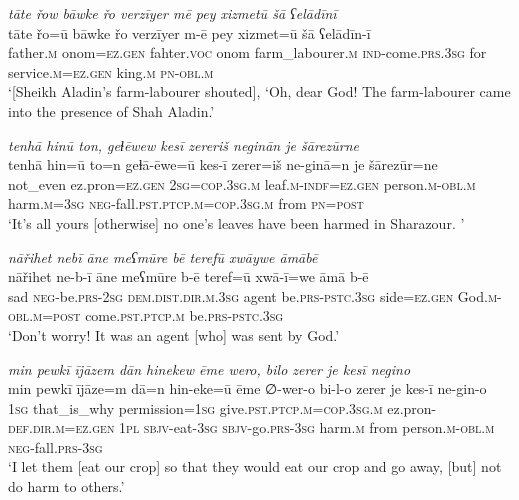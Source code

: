 \ea \label{PM.28}
\textit{tāte řow bāwke řo verzīyer mē pey xizmetū šā ʕelādīnī} \\ 
\gll tāte řo=ū bāwke řo verzīyer m-ē pey xizmet=ū šā ʕelādīn-ī \\ 
 father\textsc{.m} onom\textsc{\textsc{=ez.gen}} fahter.\textsc{voc} onom farm\_labourer\textsc{.m} \textsc{ind-}come\textsc{.prs}\textsc{.3sg} for service\textsc{.m}\textsc{\textsc{=ez.gen}} king\textsc{.m} \textsc{pn}\textsc{-obl}\textsc{.m} \\ 
\glt `[Sheikh Aladin’s farm-labourer shouted], ‘Oh, dear God! The farm-labourer came into the presence of Shah Aladin.'
\z 
 
\ea \label{PM.31}
\textit{tenhā hinū ton, geɫēwew kesī zereriš neginān je šārezūrne} \\ 
\gll tenhā hin=ū to=n geɫā-ēwe=ū kes-ī zerer=iš ne-ginā=n je šārezūr=ne \\ 
 not\_even ez.pron\textsc{\textsc{=ez.gen}} \textsc{2sg}\textsc{=cop}\textsc{.3sg}\textsc{.m} leaf\textsc{.m}\textsc{-indf}\textsc{\textsc{=ez.gen}} person\textsc{.m}\textsc{-obl}\textsc{.m} harm\textsc{.m}\textsc{=3sg} \textsc{neg-}fall\textsc{.pst}\textsc{.ptcp}\textsc{.m}\textsc{=cop}\textsc{.3sg}\textsc{.m} from \textsc{pn}\textsc{=\textsc{post}} \\ 
\glt `It’s all yours [otherwise] no one’s leaves have been harmed in Sharazour. '
\z 
 
\ea \label{PM.34}
\textit{nāřihet nebī āne meʕmūre bē terefū xwāywe āmābē} \\ 
\gll nāřihet ne-b-ī āne meʕmūre b-ē teref=ū xwā-ī=we āmā b-ē \\ 
 sad \textsc{neg-}be\textsc{.prs}-\textsc{2sg} \textsc{dem.dist}\textsc{.dir}\textsc{.m}\textsc{.3sg} agent be\textsc{.prs}\textsc{-pstc}\textsc{.3sg} side\textsc{\textsc{=ez.gen}} God\textsc{.m}\textsc{-obl}\textsc{.m}\textsc{=\textsc{post}} come\textsc{.pst}\textsc{.ptcp}\textsc{.m} be\textsc{.prs}\textsc{-pstc}\textsc{.3sg} \\ 
\glt `Don’t worry! It was an agent [who] was sent  by God.'
\z 
 
\ea \label{PM.36}
\textit{min pewkī ījāzem dān hinekew ēme wero, bilo zerer je kesī negino} \\ 
\gll min pewkī ījāze=m dā=n hin-eke=ū ēme ∅-wer-o bi-l-o zerer je kes-ī ne-gin-o \\ 
 \textsc{1sg} that\_is\_why permission\textsc{=\textsc{1sg}} give\textsc{.pst}\textsc{.ptcp}\textsc{.m}\textsc{=cop}\textsc{.3sg}\textsc{.m} ez.pron\textsc{-def}\textsc{.dir}\textsc{.m}\textsc{\textsc{=ez.gen}} \textsc{1pl} \textsc{sbjv-}eat\textsc{-3sg} \textsc{sbjv-}go\textsc{.prs}\textsc{-3sg} harm\textsc{.m} from person\textsc{.m}\textsc{-obl}\textsc{.m} \textsc{neg-}fall\textsc{.prs}\textsc{-3sg} \\ 
\glt `I let them [eat our crop] so that they would eat our crop and go away, [but] not do harm to others.'
\z 
 
